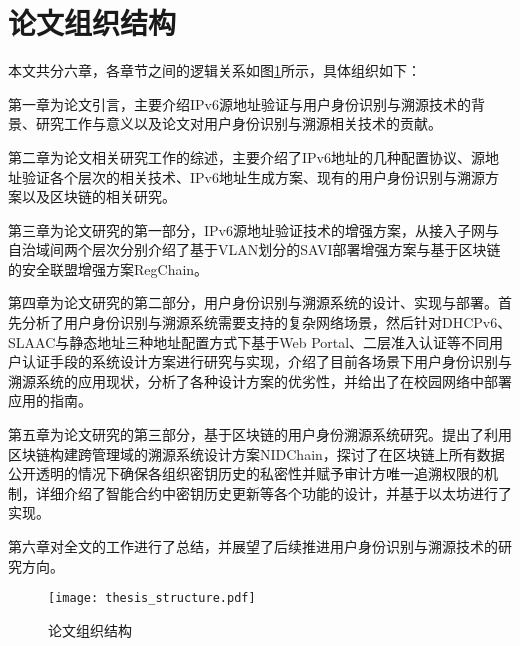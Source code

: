   \section{论文组织结构}
  \label{introduction:structure}
  本文共分六章，各章节之间的逻辑关系如图\ref{fig:thesis_structure}所示，具体组织如下：
  
  第一章为论文引言，主要介绍IPv6源地址验证与用户身份识别与溯源技术的背景、研究工作与意义以及论文对用户身份识别与溯源相关技术的贡献。

  第二章为论文相关研究工作的综述，主要介绍了IPv6地址的几种配置协议、源地址验证各个层次的相关技术、IPv6地址生成方案、现有的用户身份识别与溯源方案以及区块链的相关研究。
  
  第三章为论文研究的第一部分，IPv6源地址验证技术的增强方案，从接入子网与自治域间两个层次分别介绍了基于VLAN划分的SAVI部署增强方案与基于区块链的安全联盟增强方案RegChain。

  第四章为论文研究的第二部分，用户身份识别与溯源系统的设计、实现与部署。首先分析了用户身份识别与溯源系统需要支持的复杂网络场景，然后针对DHCPv6、SLAAC与静态地址三种地址配置方式下基于Web Portal、二层准入认证等不同用户认证手段的系统设计方案进行研究与实现，介绍了目前各场景下用户身份识别与溯源系统的应用现状，分析了各种设计方案的优劣性，并给出了在校园网络中部署应用的指南。

  第五章为论文研究的第三部分，基于区块链的用户身份溯源系统研究。提出了利用区块链构建跨管理域的溯源系统设计方案NIDChain，探讨了在区块链上所有数据公开透明的情况下确保各组织密钥历史的私密性并赋予审计方唯一追溯权限的机制，详细介绍了智能合约中密钥历史更新等各个功能的设计，并基于以太坊进行了实现。

  第六章对全文的工作进行了总结，并展望了后续推进用户身份识别与溯源技术的研究方向。

  \begin{figure}[ht]
    \centering
    \texttt{[image: thesis\_structure.pdf]}
    \caption{论文组织结构}
    \label{fig:thesis_structure}
  \end{figure}